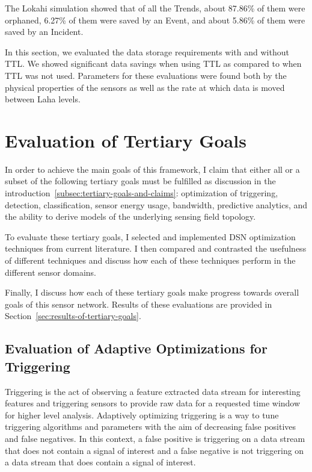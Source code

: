 The Lokahi simulation showed that of all the Trends, about 87.86\% of them were orphaned, 6.27\% of them were saved by an Event, and about 5.86\% of them were saved by an Incident.

In this section, we evaluated the data storage requirements with and without TTL. We showed significant data savings when using TTL as compared to when TTL was not used. Parameters for these evaluations were found both by the physical properties of the sensors as well as the rate at which data is moved between Laha levels.

\section{Evaluation of Tertiary Goals}\label{sec:evaluation-of-tertiary-goals}
In order to achieve the main goals of this framework, I claim that either all or a subset of the following tertiary goals must be fulfilled as discussion in the introduction~\ref{subsec:tertiary-goals-and-claims}: optimization of triggering, detection, classification, sensor energy usage, bandwidth, predictive analytics, and the ability to derive models of the underlying sensing field topology.

To evaluate these tertiary goals, I selected and implemented DSN optimization techniques from current literature. I then compared and contrasted the usefulness of different techniques and discuss how each of these techniques perform in the different sensor domains.

Finally, I discuss how each of these tertiary goals make progress towards overall goals of this sensor network. Results of these evaluations are provided in Section~\ref{sec:results-of-tertiary-goals}.

\subsection{Evaluation of Adaptive Optimizations for Triggering}\label{subsec:evaluation-of-adaptive-optimizations-for-triggering}
Triggering is the act of observing a feature extracted data stream for interesting features and triggering sensors to provide raw data for a requested time window for higher level analysis. Adaptively optimizing triggering is a way to tune triggering algorithms and parameters with the aim of decreasing false positives and false negatives. In this context, a false positive is triggering on a data stream that does not contain a signal of interest and a false negative is not triggering on a data stream that does contain a signal of interest.

